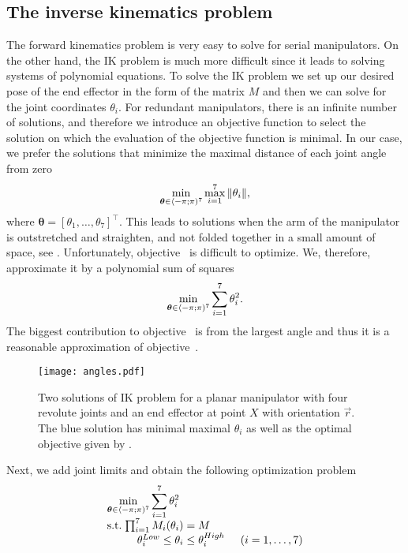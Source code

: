 \subsection{The inverse kinematics problem}
The forward kinematics problem is very easy to solve for serial manipulators.
On the other hand, the IK problem is much more difficult since it leads to solving systems of polynomial equations.
To solve the IK problem we set up our desired pose of the end effector in the form of the matrix $M$ and then we can solve  for the joint coordinates $\theta_i$.
For redundant manipulators, there is an infinite number of solutions, and therefore we introduce an objective function to select the solution on which the evaluation of the objective function is minimal. In our case, we prefer the solutions that minimize the maximal distance of each joint angle from zero
\begin{align}
  \min_{\bm{\theta}\in\langle-\pi;\pi)^7} \max_{i=1}^7\|\theta_i\|,\labeleq{IKT:objectiveMinMax}
\end{align}
where $\bm{\theta} = [\theta_1, \ldots, \theta_7]^\top$.
This leads to solutions when the arm of the manipulator is outstretched and straighten, and not folded together in a small amount of space, see .
Unfortunately, objective~ is difficult to optimize.
We, therefore, approximate it by a polynomial sum of squares
\begin{align}
  \min_{\bm{\theta}\in\langle-\pi;\pi)^7} \sum_{i=1}^7\theta_i^2.\labeleq{IKT:objectiveSOS}
\end{align}
The biggest contribution to objective~ is from the largest angle and thus it is a reasonable approximation of objective~.

\begin{figure}[ht]
  \centering
  \texttt{[image: angles.pdf]}
  \caption{Two solutions of IK problem for a planar manipulator with four revolute joints and an end effector at point $X$ with orientation $\vec{r}$. The blue solution has minimal maximal $\theta_i$ as well as the optimal objective given by .}
\end{figure}

Next, we add joint limits and obtain the following optimization problem
\begin{align}
  \arraycolsep=1.4pt
  \begin{array}{lrcl@{\hskip0.5cm}l}
    \multicolumn{5}{l}{\displaystyle \min_{\bm{\theta}\in\langle-\pi;\pi)^7} \sum_{i=1}^7\theta_i^2} \\
    \text{s.t.} & \prod_{i=1}^7M_i(\theta_i) &=& M \\
    & \theta_i^{Low} \leq \theta_i &\leq& \theta_i^{High} & (i = 1,\ldots,7) \\
  \end{array}\labeleq{IKT:optimizationTask}
\end{align}

